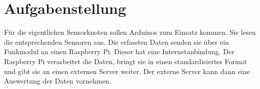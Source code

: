 \section{Aufgabenstellung}
Für die eigentlichen Sensorknoten sollen Arduinos zum Einsatz kommen. Sie lesen die entsprechenden Sensoren aus. Die erfassten Daten senden sie über ein Funkmodul an einen Raspberry Pi. Dieser hat eine Internetanbindung. Der Raspberry Pi verarbeitet die Daten, bringt sie in einen standardisiertes Format und gibt sie an einen externen Server weiter. Der  externe Server kann dann eine Auswertung der Daten vornehmen. 